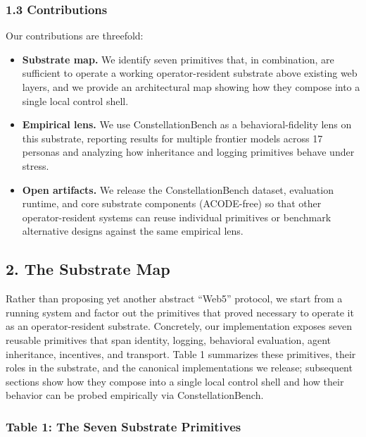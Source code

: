 \subsubsection{1.3 Contributions}\label{contributions}

Our contributions are threefold:

\begin{itemize}
\tightlist
\item
  \textbf{Substrate map.} We identify seven primitives that, in
  combination, are sufficient to operate a working operator-resident
  substrate above existing web layers, and we provide an architectural
  map showing how they compose into a single local control shell.
\item
  \textbf{Empirical lens.} We use ConstellationBench as a
  behavioral-fidelity lens on this substrate, reporting results for
  multiple frontier models across 17 personas and analyzing how
  inheritance and logging primitives behave under stress.
\item
  \textbf{Open artifacts.} We release the ConstellationBench dataset,
  evaluation runtime, and core substrate components (ACODE-free) so that
  other operator-resident systems can reuse individual primitives or
  benchmark alternative designs against the same empirical lens.
\end{itemize}

\subsection{2. The Substrate Map}\label{the-substrate-map}

Rather than proposing yet another abstract ``Web5'' protocol, we start
from a running system and factor out the primitives that proved
necessary to operate it as an operator-resident substrate. Concretely,
our implementation exposes seven reusable primitives that span identity,
logging, behavioral evaluation, agent inheritance, incentives, and
transport. Table 1 summarizes these primitives, their roles in the
substrate, and the canonical implementations we release; subsequent
sections show how they compose into a single local control shell and how
their behavior can be probed empirically via ConstellationBench.

\subsubsection{Table 1: The Seven Substrate
Primitives}\label{table-1-the-seven-substrate-primitives}

